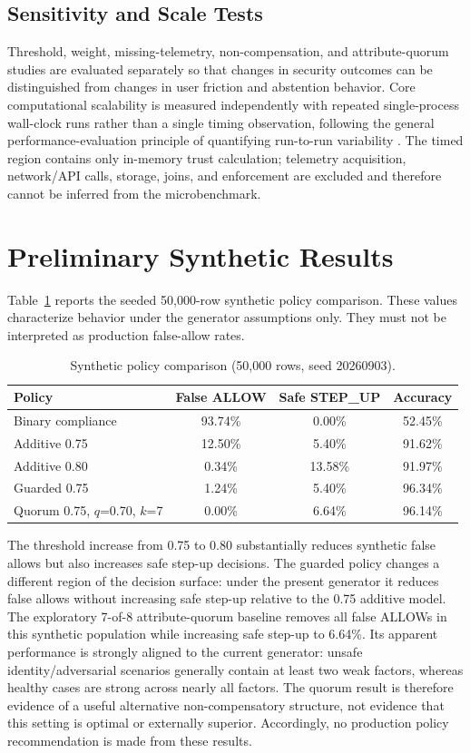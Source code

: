 \documentclass[journal]{IEEEtran}
\begin{document}
\subsection{Sensitivity and Scale Tests}
Threshold, weight, missing-telemetry, non-compensation, and attribute-quorum studies
are evaluated separately so that changes in security outcomes can be distinguished
from changes in user friction and abstention behavior. Core computational scalability
is measured independently with repeated single-process wall-clock runs rather than a
single timing observation, following the general performance-evaluation principle of
quantifying run-to-run variability \cite{kalibera2013benchmarking}. The timed region
contains only in-memory trust calculation; telemetry acquisition, network/API calls,
storage, joins, and enforcement are excluded and therefore cannot be inferred from the
microbenchmark.

\section{Preliminary Synthetic Results}
Table~\ref{tab:synthetic-policy} reports the seeded 50,000-row synthetic policy
comparison. These values characterize behavior under the generator assumptions only.
They must not be interpreted as production false-allow rates.

\begin{table}[ht]
\centering
\caption{Synthetic policy comparison (50,000 rows, seed 20260903).}
\label{tab:synthetic-policy}
\begin{tabular}{lccc}
\toprule
Policy & False ALLOW & Safe STEP\_UP & Accuracy \\
\midrule
Binary compliance & 93.74\% & 0.00\% & 52.45\% \\
Additive 0.75 & 12.50\% & 5.40\% & 91.62\% \\
Additive 0.80 & 0.34\% & 13.58\% & 91.97\% \\
Guarded 0.75 & 1.24\% & 5.40\% & 96.34\% \\
Quorum 0.75, $q$=0.70, $k$=7 & 0.00\% & 6.64\% & 96.14\% \\
\bottomrule
\end{tabular}
\end{table}

The threshold increase from 0.75 to 0.80 substantially reduces synthetic false allows
but also increases safe step-up decisions. The guarded policy changes a different
region of the decision surface: under the present generator it reduces false allows
without increasing safe step-up relative to the 0.75 additive model. The exploratory
7-of-8 attribute-quorum baseline removes all false ALLOWs in this synthetic population
while increasing safe step-up to 6.64\%. Its apparent performance is strongly aligned
to the current generator: unsafe identity/adversarial scenarios generally contain at
least two weak factors, whereas healthy cases are strong across nearly all factors.
The quorum result is therefore evidence of a useful alternative non-compensatory
structure, not evidence that this setting is optimal or externally superior.
Accordingly, no production policy recommendation is made from these results.
\end{document}

